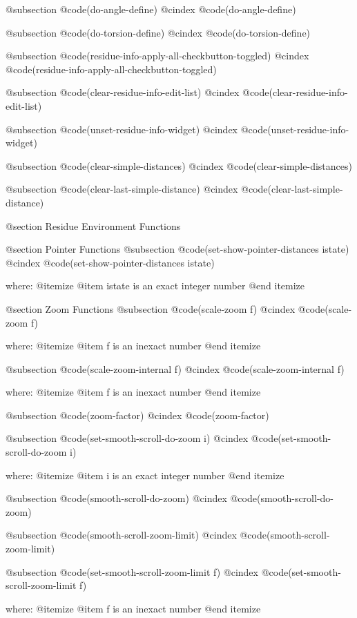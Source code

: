 @subsection @code{(do-angle-define)}
@cindex @code{(do-angle-define)}
 
@subsection @code{(do-torsion-define)}
@cindex @code{(do-torsion-define)}
 
@subsection @code{(residue-info-apply-all-checkbutton-toggled)}
@cindex @code{(residue-info-apply-all-checkbutton-toggled)}
 
@subsection @code{(clear-residue-info-edit-list)}
@cindex @code{(clear-residue-info-edit-list)}
 
@subsection @code{(unset-residue-info-widget)}
@cindex @code{(unset-residue-info-widget)}
 
@subsection @code{(clear-simple-distances)}
@cindex @code{(clear-simple-distances)}
 
@subsection @code{(clear-last-simple-distance)}
@cindex @code{(clear-last-simple-distance)}
 

@section Residue Environment Functions 

@section Pointer Functions 
@subsection @code{(set-show-pointer-distances istate)}
@cindex @code{(set-show-pointer-distances istate)}
 
where: 
 @itemize 
     @item istate is an exact integer number
 @end itemize



@section Zoom Functions 
@subsection @code{(scale-zoom f)}
@cindex @code{(scale-zoom f)}
 
where: 
 @itemize 
     @item f is an inexact number
 @end itemize


@subsection @code{(scale-zoom-internal f)}
@cindex @code{(scale-zoom-internal f)}
 
where: 
 @itemize 
     @item f is an inexact number
 @end itemize


@subsection @code{(zoom-factor)}
@cindex @code{(zoom-factor)}
 
@subsection @code{(set-smooth-scroll-do-zoom i)}
@cindex @code{(set-smooth-scroll-do-zoom i)}
 
where: 
 @itemize 
     @item i is an exact integer number
 @end itemize


@subsection @code{(smooth-scroll-do-zoom)}
@cindex @code{(smooth-scroll-do-zoom)}
 
@subsection @code{(smooth-scroll-zoom-limit)}
@cindex @code{(smooth-scroll-zoom-limit)}
 
@subsection @code{(set-smooth-scroll-zoom-limit f)}
@cindex @code{(set-smooth-scroll-zoom-limit f)}
 
where: 
 @itemize 
     @item f is an inexact number
 @end itemize


